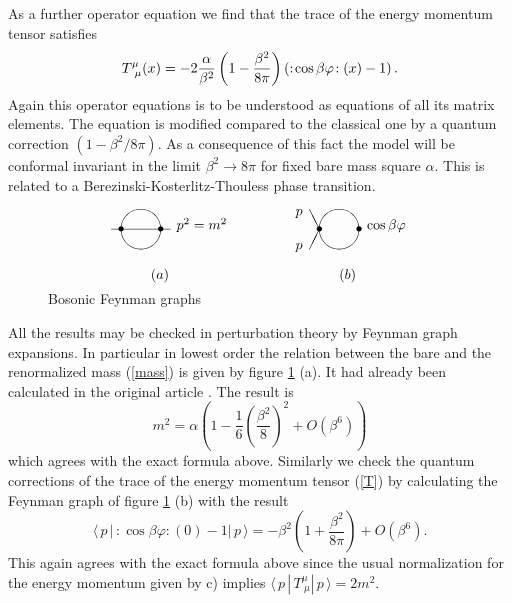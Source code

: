 \documentclass[a4paper,12pt]{article}
\begin{document}
As a further operator equation we find \cite{BK1,BK2} that the trace of the
energy momentum tensor satisfies 
\begin{equation}
T_{~\mu }^{\mu }(x)=-2\frac{\alpha }{\beta ^{2}}\left( 1-\frac{\beta ^{2}}{%
8\pi }\right) \left( :\!\cos \beta \varphi \!:(x)-1\right) .  \label{T}
\end{equation}
Again this operator equations is to be understood as equations of all its
matrix elements. The equation is modified compared to the classical one by a
quantum correction $(1-\beta ^{2}/8\pi )$. As a consequence of this fact the
model will be conformal invariant in the limit $\beta ^{2}\rightarrow 8\pi $
for fixed bare mass square $\alpha $. This is related to a
Berezinski-Kosterlitz-Thouless \cite{KS} phase transition.

\begin{figure}[tbh]
\[
\begin{array}{l}
\unitlength5mm \begin{picture}(14,3) \put(1,2){\oval(2,2)}
\put(0,2){\makebox(0,0){$\bullet$}} \put(2,2){\makebox(0,0){$\bullet$}}
\put(-.5,2){\line(1,0){3}} \put(2.8,2){$p^2=m^2$} \put(1.5,-.5){$(a)$}
\put(11,2){\oval(2,2)} \put(10,2){\makebox(0,0){$\bullet$}}
\put(12,2){\makebox(0,0){$\bullet$}} \put(12.4,2){$\cos \beta \varphi$}
\put(10,2){\line(-1,2){.5}} \put(10,2){\line(-1,-2){.5}} \put(8.8,1){$p$}
\put(8.8,2.7){$p$} \put(11,-.5){$(b)$} \end{picture}
\end{array}
\]
\caption{Bosonic Feynman graphs}
\label{f8}
\end{figure}
All the results may be checked in perturbation theory by Feynman graph
expansions. In particular in lowest order the relation between the bare and
the renormalized mass (\ref{mass}) is given by figure \ref{f8} (a). It had
already been calculated in the original article \cite{KW}. The result is 
\[
m^{2}=\alpha \left( 1-\frac{1}{6}\left( \frac{\beta ^{2}}{8}\right)
^{2}+O(\beta ^{6})\right) 
\]
which agrees with the exact formula above. Similarly we check the quantum
corrections of the trace of the energy momentum tensor (\ref{T}) by
calculating the Feynman graph of figure \ref{f8} (b) with the result \cite{KW}
\[
\langle \,p\,|\,\!:\!\cos \beta \varphi \!:(0)-1|\,p\,\rangle =-\beta
^{2}\left( 1+\frac{\beta ^{2}}{8\pi }\right) +O(\beta ^{6}). 
\]
This again agrees with the exact formula above since the usual normalization
for the energy momentum given by c) implies $\langle \,p\,|\,T_{~\mu }^{\mu
}|\,p\,\rangle =2m^{2}$.
\end{document}
